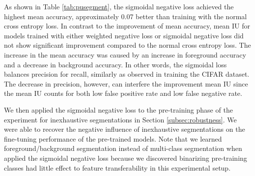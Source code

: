 As shown in Table \ref{tab:pusegment}, the sigmoidal negative loss achieved the highest mean accuracy, approximately 0.07 better than training with the normal cross entropy loss.
In contrast to the improvement of mean accuracy, mean IU for models trained with either weighted negative loss or sigmoidal negative loss did not show significant improvement compared to the normal cross entropy loss.
The increase in the mean accuracy was caused by an increase in
foreground accuracy and a decrease in background accuracy.
In other words, the sigmoidal loss balances precision for recall, similarly as observed in training the CIFAR dataset.
The decrease in precision, however, can interfere the improvement mean IU since the mean IU counts for both low false positive rate and low false negative rate.


We then applied the sigmoidal negative loss to the pre-training phase of the experiment for inexhaustive segmentations in Section \ref{subsec:robustness}.
We were able to recover the negative influence of inexhaustive segmentations on the fine-tuning performance of the pre-trained models.
Note that we learned foreground/background segmentation instead of multi-class segmentation when applied the sigmoidal negative loss because we discovered binarizing pre-training classes had little effect to feature transferability in this experimental setup.


